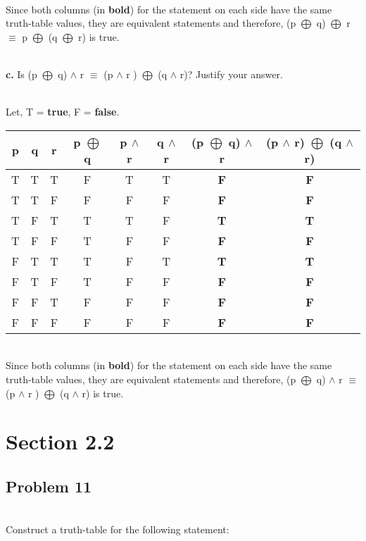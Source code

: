 \documentclass{article}
\begin{document}
\\ Since both columns (in \textbf{bold}) for the statement on each side have the same truth-table values, they are equivalent statements and therefore, (p $\bigoplus$ q) $\bigoplus$ r $\equiv$ p $\bigoplus$ (q $\bigoplus$ r) is true.


\\ \textbf{c.} Is (p $\bigoplus$ q) $\wedge$ r  $\equiv$ (p $\wedge$ r )  $\bigoplus$ (q $\wedge$ r)? Justify your answer.

\\ Let, T = \textbf{true}, F = \textbf{false}.
\begin{center}
	\begin{tabular}{ |c|c|c|c|c|c|c|c| } 
		\hline
		p & q & r & p $\bigoplus$ q & p $\wedge$ r & q $\wedge$ r & (p $\bigoplus$ q) $\wedge$ r & (p $\wedge$ r) $\bigoplus$ (q $\wedge$ r)  \\ 
		\hline
		T & T & T & F & T & T & \textbf{F} & \textbf{F} \\ 
		T & T & F & F & F & F & \textbf{F} & \textbf{F} \\ 
		T & F & T & T & T & F & \textbf{T} & \textbf{T} \\ 
		T & F & F & T & F & F & \textbf{F} & \textbf{F} \\
		F & T & T & T & F & T & \textbf{T} & \textbf{T} \\ 
		F & T & F & T & F & F & \textbf{F} & \textbf{F} \\
		F & F & T & F & F & F & \textbf{F} & \textbf{F} \\ 
		F & F & F & F & F & F & \textbf{F} & \textbf{F} \\
		\hline
	\end{tabular}
\end{center}

\\ Since both columns (in \textbf{bold}) for the statement on each side have the same truth-table values, they are equivalent statements and therefore, (p $\bigoplus$ q) $\wedge$ r  $\equiv$ (p $\wedge$ r )  $\bigoplus$ (q $\wedge$ r) is true.

\section*{Section 2.2}
\subsection*{Problem 11}
\\ Construct a truth-table for the following statement:
\end{document}
